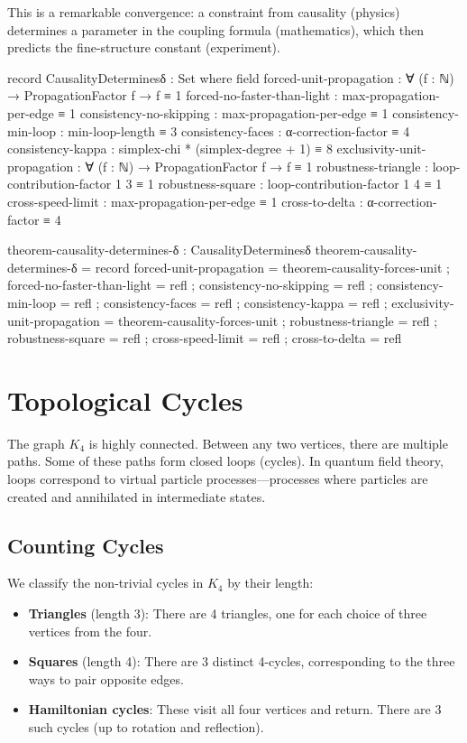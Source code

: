 \documentclass[11pt,a4paper]{book}
\begin{document}
This is a remarkable convergence: a constraint from causality (physics) determines a 
parameter in the coupling formula (mathematics), which then predicts the fine-structure 
constant (experiment).

\begin{code}
record CausalityDeterminesδ : Set where
  field
    forced-unit-propagation    : ∀ (f : ℕ) → PropagationFactor f → f ≡ 1
    forced-no-faster-than-light : max-propagation-per-edge ≡ 1
    consistency-no-skipping    : max-propagation-per-edge ≡ 1
    consistency-min-loop       : min-loop-length ≡ 3
    consistency-faces          : α-correction-factor ≡ 4
    consistency-kappa          : simplex-chi * (simplex-degree + 1) ≡ 8
    exclusivity-unit-propagation : ∀ (f : ℕ) → PropagationFactor f → f ≡ 1
    robustness-triangle : loop-contribution-factor 1 3 ≡ 1
    robustness-square   : loop-contribution-factor 1 4 ≡ 1
    cross-speed-limit   : max-propagation-per-edge ≡ 1
    cross-to-delta      : α-correction-factor ≡ 4

theorem-causality-determines-δ : CausalityDeterminesδ
theorem-causality-determines-δ = record
  { forced-unit-propagation = theorem-causality-forces-unit
  ; forced-no-faster-than-light = refl
  ; consistency-no-skipping = refl
  ; consistency-min-loop = refl
  ; consistency-faces = refl
  ; consistency-kappa = refl
  ; exclusivity-unit-propagation = theorem-causality-forces-unit
  ; robustness-triangle = refl
  ; robustness-square = refl
  ; cross-speed-limit = refl
  ; cross-to-delta = refl
  }
\end{code}

\chapter{Topological Cycles}

The graph $K_4$ is highly connected. Between any two vertices, there are multiple paths. 
Some of these paths form closed loops (cycles). In quantum field theory, loops correspond 
to virtual particle processes—processes where particles are created and annihilated in 
intermediate states.

\section{Counting Cycles}

We classify the non-trivial cycles in $K_4$ by their length:
\begin{itemize}
\item \textbf{Triangles} (length 3): There are 4 triangles, one for each choice of three 
  vertices from the four.
\item \textbf{Squares} (length 4): There are 3 distinct 4-cycles, corresponding to the 
  three ways to pair opposite edges.
\item \textbf{Hamiltonian cycles}: These visit all four vertices and return. There are 
  3 such cycles (up to rotation and reflection).
\end{itemize}
\end{document}

